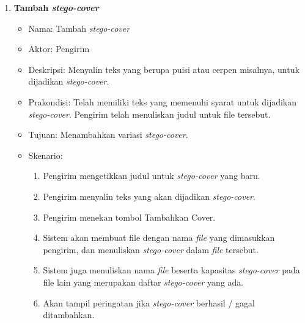 \begin{enumerate}
	\item \textbf{Tambah \textit{stego-cover}}
	\begin{itemize}
		\item Nama: Tambah \textit{stego-cover}
		\item Aktor: Pengirim
		\item Deskripsi: Menyalin teks yang berupa puisi atau cerpen misalnya, untuk dijadikan \textit{stego-cover}.
		\item Prakondisi: Telah memiliki teks yang memenuhi syarat untuk dijadikan \textit{stego-cover}. Pengirim telah menuliskan judul untuk file tersebut.
		\item Tujuan: Menambahkan variasi \textit{stego-cover}.
		\item Skenario:
			\begin{enumerate}
				\item Pengirim mengetikkan judul untuk \textit{stego-cover} yang baru.			
				\item Pengirim menyalin teks yang akan dijadikan \textit{stego-cover}.
				\item Pengirim menekan tombol Tambahkan Cover.
				\item Sistem akan membuat file dengan nama \textit{file} yang dimasukkan pengirim, dan menuliskan \textit{stego-cover} dalam \textit{file} tersebut.
				\item Sistem juga menuliskan nama \textit{file} beserta kapasitas \textit{stego-cover} pada file lain yang merupakan daftar \textit{stego-cover} yang ada.
				\item Akan tampil peringatan jika \textit{stego-cover} berhasil / gagal ditambahkan.
			\end{enumerate}
	\end{itemize}
	

\end{enumerate}
